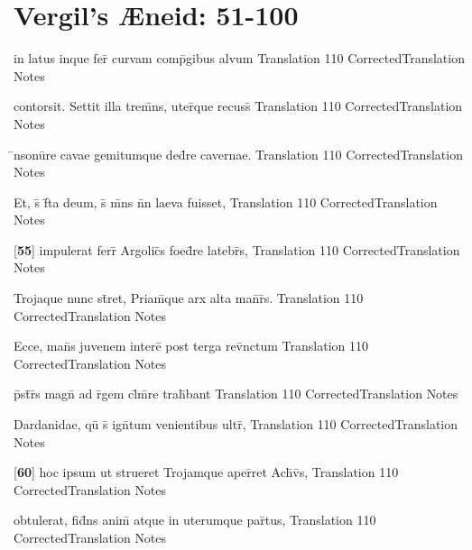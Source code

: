 \section{Vergil's {\AE}neid: 51-100} %

\latline
  {in latus inque fer\={\macron {\i}} curvam comp\={}gibus alvum}
  { Translation }
  {110}
  { CorrectedTranslation }
  { Notes }


\latline
  {contorsit.  Settit illa trem\={}ns, uter\={}que recuss\={}}
  { Translation }
  {110}
  { CorrectedTranslation }
  { Notes }


\latline
  {\={\macron {\i}}nsonu\={}re cavae gemitumque ded\={}re cavernae.}
  { Translation }
  {110}
  { CorrectedTranslation }
  { Notes }


\latline
  {Et, s\={\macron {\i}} f\={}ta deum, s\={\macron {\i}} m\={}ns n\={}n laeva fuisset,}
  { Translation }
  {110}
  { CorrectedTranslation }
  { Notes }


\latline
  {[\textbf{55}] impulerat ferr\={} Argolic\={}s foed\={}re latebr\={}s,}
  { Translation }
  {110}
  { CorrectedTranslation }
  { Notes }


\latline
  {Trojaque nunc st\={}ret, Priam\={\macron {\i}}que arx alta man\={}r\={}s.}
  { Translation }
  {110}
  { CorrectedTranslation }
  { Notes }


\latline
  {Ecce, man\={}s juvenem intere\={} post terga rev\={\macron {\i}}nctum}
  { Translation }
  {110}
  { CorrectedTranslation }
  { Notes }


\latline
  {p\={}st\={}r\={}s magn\={} ad r\={}gem cl\={}m\={}re trah\={}bant}
  { Translation }
  {110}
  { CorrectedTranslation }
  { Notes }


\latline
  {Dardanidae, qu\={\macron {\i}} s\={} ign\={}tum venientibus ultr\={},}
  { Translation }
  {110}
  { CorrectedTranslation }
  { Notes }


\latline
  {[\textbf{60}] hoc ipsum ut strueret Trojamque aper\={\macron {\i}}ret Ach\={\macron {\i}}v\={\macron {\i}}s,}
  { Translation }
  {110}
  { CorrectedTranslation }
  { Notes }


\latline
  {obtulerat, fid\={}ns anim\={\macron {\i}} atque in uterumque par\={}tus,}
  { Translation }
  {110}
  { CorrectedTranslation }
  { Notes }


